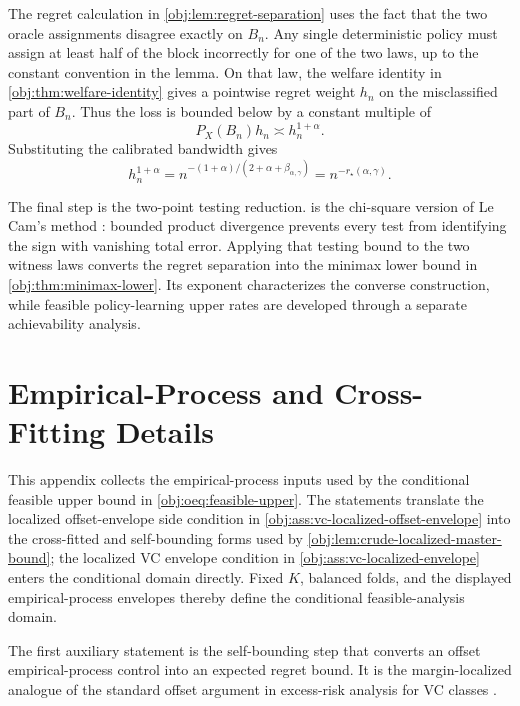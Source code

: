 \documentclass[11pt]{article}
\begin{document}
The regret calculation in \cref{obj:lem:regret-separation} uses the fact that the two oracle assignments disagree exactly on \(B_n\).  Any single deterministic policy must assign at least half of the block incorrectly for one of the two laws, up to the constant convention in the lemma.  On that law, the welfare identity in \cref{obj:thm:welfare-identity} gives a pointwise regret weight \(h_n\) on the misclassified part of \(B_n\).  Thus the loss is bounded below by a constant multiple of
\[
P_X(B_n)h_n
\asymp
h_n^{1+\alpha}.
\]
Substituting the calibrated bandwidth gives
\[
h_n^{1+\alpha}
=
n^{-(1+\alpha)/(2+\alpha+\beta_{\alpha,\gamma})}
=
n^{-r_\star(\alpha,\gamma)}.
\]

The final step is the two-point testing reduction.   is the chi-square version of Le Cam's method \citep{LeCam1986,Tsybakov2009}: bounded product divergence prevents every test from identifying the sign with vanishing total error.  Applying that testing bound to the two witness laws converts the regret separation into the minimax lower bound in \cref{obj:thm:minimax-lower}.  Its exponent characterizes the converse construction, while feasible policy-learning upper rates are developed through a separate achievability analysis.


\section{Empirical-Process and Cross-Fitting Details}

This appendix collects the empirical-process inputs used by the conditional feasible upper bound in \cref{obj:oeq:feasible-upper}.  The statements translate the localized offset-envelope side condition in \cref{obj:ass:vc-localized-offset-envelope} into the cross-fitted and self-bounding forms used by \cref{obj:lem:crude-localized-master-bound}; the localized VC envelope condition in \cref{obj:ass:vc-localized-envelope} enters the conditional domain directly.  Fixed \(K\), balanced folds, and the displayed empirical-process envelopes thereby define the conditional feasible-analysis domain.

The first auxiliary statement is the self-bounding step that converts an offset empirical-process control into an expected regret bound.  It is the margin-localized analogue of the standard offset argument in excess-risk analysis for VC classes \citep{Audibert2007,Massart2006,Tsybakov2009}.
\end{document}
